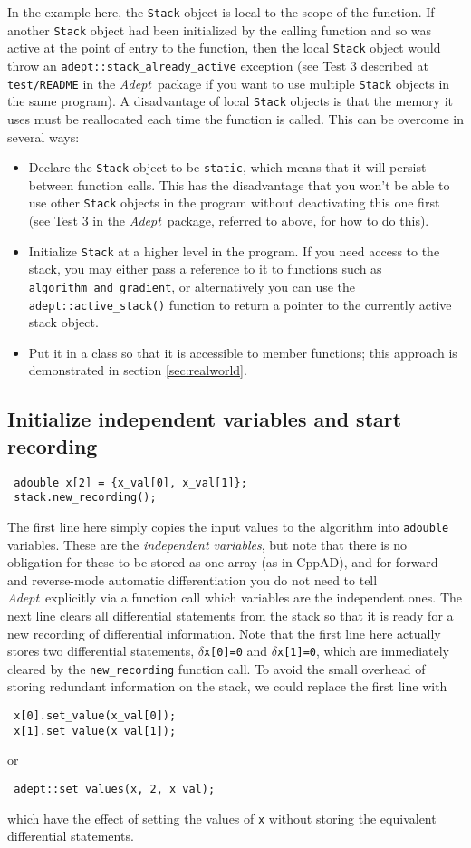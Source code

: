 \documentclass[a4,oneside]{book}
\def\codesize{\small}
\def\Adept{\emph{Adept}}
\def\code#1{{\codesize\texttt{#1}}}
\begin{document}
In the example here, the \code{Stack} object is local to the scope of
the function. If another \code{Stack} object had been initialized by
the calling function and so was active at the point of entry to the
function, then the local \code{Stack} object would throw an
\code{adept::stack\_already\_active} exception (see Test 3 described
at \code{test/README} in the \Adept\ package if you want to use
multiple \code{Stack} objects in the same program).  A disadvantage of
local \code{Stack} objects is that the memory it uses must be
reallocated each time the function is called.  This can be overcome in
several ways:
\begin{itemize}
\item Declare the \code{Stack} object to be \code{static}, which means
  that it will persist between function calls. This has the
  disadvantage that you won't be able to use other \code{Stack}
  objects in the program without deactivating this one first (see Test
  3 in the \Adept\ package, referred to above, for how to do this).
\item Initialize \code{Stack} at a higher level in the program. If you
  need access to the stack, you may either pass a reference to it to
  functions such as \code{algorithm\_and\_gradient}, or alternatively
  you can use the \code{adept::active\_stack()} function to return a
  pointer to the currently active stack object.
\item Put it in a class so that it is accessible to member functions;
  this approach is demonstrated in section \ref{sec:realworld}.
\end{itemize}
%
\subsection{Initialize independent variables and start recording}
\begin{lstlisting}
 adouble x[2] = {x_val[0], x_val[1]};
 stack.new_recording();
\end{lstlisting}
The first line here simply copies the input values to the algorithm
into \code{adouble} variables. These are the \emph{independent
  variables}, but note that there is no obligation for these to be
stored as one array (as in CppAD), and for forward- and reverse-mode
automatic differentiation you do not need to tell \Adept\ explicitly
via a function call which variables are the independent ones. The next
line clears all differential statements from the stack so that it is
ready for a new recording of differential information.
%
Note that the first line here actually stores two differential
statements, $\delta$\code{x[0]=0} and $\delta$\code{x[1]=0}, which are
immediately cleared by the \code{new\_recording} function call.  To
avoid the small overhead of storing redundant information on the
stack, we could replace the first line with 
\begin{lstlisting}
 x[0].set_value(x_val[0]);
 x[1].set_value(x_val[1]);
\end{lstlisting}
or
\begin{lstlisting}
 adept::set_values(x, 2, x_val);
\end{lstlisting}
which have the effect of setting the values of \code{x} without storing
the equivalent differential statements.
\end{document}
